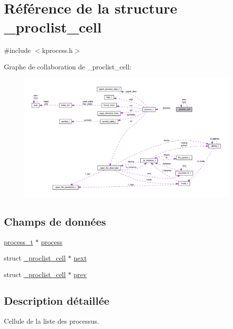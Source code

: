 \hypertarget{struct__proclist__cell}{\section{Référence de la structure \-\_\-proclist\-\_\-cell}
\label{struct__proclist__cell}
}


{\ttfamily \#include $<$kprocess.\-h$>$}



Graphe de collaboration de \-\_\-proclist\-\_\-cell\-:\nopagebreak
\begin{figure}[H]
\begin{center}
\leavevmode
\includegraphics[width=350pt]{struct__proclist__cell__coll__graph}
\end{center}
\end{figure}
\subsection*{Champs de données}
\begin{DoxyCompactItemize}
\item 
\hyperlink{structprocess__t}{process\-\_\-t} $\ast$ \hyperlink{struct__proclist__cell_abe320ebc4ea6556f17dd28e93efb6b31}{process}
\item 
struct \hyperlink{struct__proclist__cell}{\-\_\-proclist\-\_\-cell} $\ast$ \hyperlink{struct__proclist__cell_a76062c3c8bce7b458ed610e7568c0858}{next}
\item 
struct \hyperlink{struct__proclist__cell}{\-\_\-proclist\-\_\-cell} $\ast$ \hyperlink{struct__proclist__cell_aee5c3bd7595d05c693fe6df63937052e}{prev}
\end{DoxyCompactItemize}


\subsection{Description détaillée}
Cellule de la liste des processus. 


